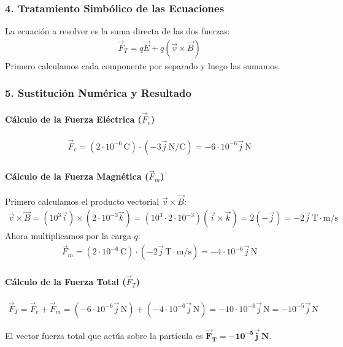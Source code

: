 \subsubsection*{4. Tratamiento Simbólico de las Ecuaciones}
La ecuación a resolver es la suma directa de las dos fuerzas:
\begin{gather}
    \vec{F}_T = q\vec{E} + q(\vec{v} \times \vec{B})
\end{gather}
Primero calculamos cada componente por separado y luego las sumamos.

\subsubsection*{5. Sustitución Numérica y Resultado}
\paragraph*{Cálculo de la Fuerza Eléctrica ($\vec{F}_e$)}
\begin{gather}
    \vec{F}_e = (2 \cdot 10^{-6}\,\text{C}) \cdot (-3\vec{j}\,\text{N/C}) = -6 \cdot 10^{-6}\vec{j}\,\text{N}
\end{gather}

\paragraph*{Cálculo de la Fuerza Magnética ($\vec{F}_m$)}
Primero calculamos el producto vectorial $\vec{v} \times \vec{B}$:
\begin{gather}
    \vec{v} \times \vec{B} = (10^3\vec{i}) \times (2 \cdot 10^{-3}\vec{k}) = (10^3 \cdot 2 \cdot 10^{-3}) (\vec{i} \times \vec{k}) = 2(-\vec{j}) = -2\vec{j}\,\text{T}\cdot\text{m/s}
\end{gather}
Ahora multiplicamos por la carga $q$:
\begin{gather}
    \vec{F}_m = (2 \cdot 10^{-6}\,\text{C}) \cdot (-2\vec{j}\,\text{T}\cdot\text{m/s}) = -4 \cdot 10^{-6}\vec{j}\,\text{N}
\end{gather}

\paragraph*{Cálculo de la Fuerza Total ($\vec{F}_T$)}
\begin{gather}
    \vec{F}_T = \vec{F}_e + \vec{F}_m = (-6 \cdot 10^{-6}\vec{j}\,\text{N}) + (-4 \cdot 10^{-6}\vec{j}\,\text{N}) = -10 \cdot 10^{-6}\vec{j}\,\text{N} = -10^{-5}\vec{j}\,\text{N}
\end{gather}
\begin{cajaresultado}
    El vector fuerza total que actúa sobre la partícula es $\boldsymbol{\vec{F}_T = -10^{-5}\vec{j}\,\textbf{N}}$.
\end{cajaresultado}

